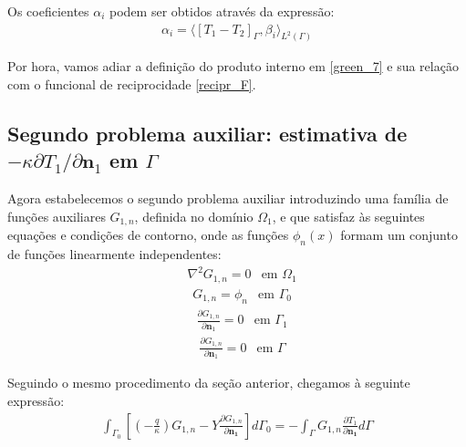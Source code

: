 Os coeficientes $\alpha_i$ podem ser obtidos através da expressão:
\begin{align}
	\alpha_i = \langle [T_1 - T_2]_\Gamma, \beta_i\rangle_{L^2(\Gamma)}\label{green_7}
\end{align}

Por hora, vamos adiar a definição do produto interno em \eqref{green_7} e sua relação com o funcional de reciprocidade \eqref{recipr_F}.

\subsection{Segundo problema auxiliar: estimativa de $-\kappa \partial{T_1}/\partial{\mathbf{n}_1}$ em $\Gamma$}\label{sec_repr_G}

Agora estabelecemos o segundo problema auxiliar introduzindo uma família de funções auxiliares $G_{1, n}$, definida
no domínio $\Omega_1$, e que satisfaz às seguintes equações e condições de contorno, onde as funções
$\phi_n(x)$ formam um conjunto de funções linearmente independentes:
\begin{align}
	& \nabla^2 G_{1,n} = 0 & \text{em } \Omega_1 \label{harm_G1}
\end{align}
\begin{align}
	& G_{1,n} = \phi_n & \text{em } \Gamma_0
\end{align}
\begin{align}
	& \frac{\partial G_{1,n}}{\partial \mathbf{n}_1} = 0 & \text{em } \Gamma_1
\end{align}
\begin{align}
	& \frac{\partial G_{1,n}}{\partial \mathbf{n}_1} = 0 & \text{em } \Gamma \label{cc_G1_5}
\end{align}

Seguindo o mesmo procedimento da seção anterior, chegamos à seguinte expressão:
% 
\begin{align}
	\int_{\Gamma_0}\left[ \left(-\frac{q}{\kappa}\right) G_{1,n}- Y\frac{\partial G_{1,n}}{\partial\mathbf{n_1}}\right] d\Gamma_0
	=
	-
	\int_{\Gamma} G_{1,n}\frac{\partial T_1}{\partial\mathbf{n_1}} d\Gamma
\end{align}

